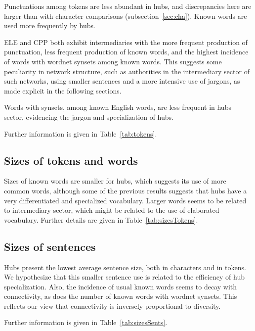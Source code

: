 Punctuations among tokens are less abundant in hubs, and discrepancies here are larger than with character comparisons (subsection~\ref{sec:cha}). Known words are used more frequently by hubs.

ELE and CPP both exhibit intermediaries 
with the more frequent production of punctuation,
less frequent production of known words, and
the highest incidence of words with wordnet synsets among known words.
This suggests some peculiarity in network structure,
such as authorities in the intermediary sector of such networks,
using smaller sentences and a more intensive use of jargons,
as made explicit in the following sections.

Words with synsets,
among known English words, are less frequent in hubs sector,
evidencing the jargon and specialization of hubs.

Further information is given in Table~\ref{tab:tokens}.

\subsection{Sizes of tokens and words}\label{subsec:tw2}
%
Sizes of known words are smaller for hubs, which suggests its use of more common words, although some of the previous results suggests that hubs have a very differentiated and specialized vocabulary. 
Larger words seems to be related to intermediary sector,
which might be related to the use of elaborated vocabulary.
Further details are given in Table~\ref{tab:sizesTokens}.

\subsection{Sizes of sentences}\label{subsec:ss}

Hubs present the lowest average sentence size,
both in characters and in tokens.
We hypothesize that this smaller sentence use
is related to the efficiency of hub specialization.
Also, the incidence of usual known words seems to decay with connectivity, as does the number of known words with wordnet synsets.
This reflects our view that connectivity is inversely proportional
to diversity.

Further information is given in Table~\ref{tab:sizesSents}.

